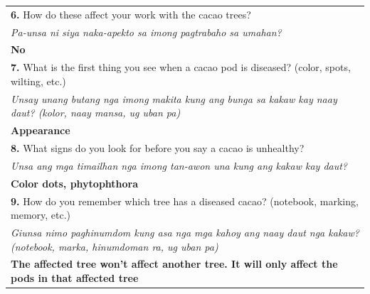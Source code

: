 \begin{longtable}{|p{4cm}|p{10cm}|}
		\multicolumn{2}{|p{12cm}|}{\vspace{0.1cm} \textbf{6.} How do these affect your work with the cacao trees?}                                                                             \\
		\multicolumn{2}{|p{12cm}|}{\textit{Pa-unsa ni siya naka-apekto sa imong pagtrabaho sa umahan?}}                                                                                        \\
		\multicolumn{2}{|p{12cm}|}{\textbf{No}}                                                                                                                                                \\

		\multicolumn{2}{|p{12cm}|}{\vspace{0.1cm} \textbf{7.} What is the first thing you see when a cacao pod is diseased? (color, spots, wilting, etc.)}                                     \\
		\multicolumn{2}{|p{12cm}|}{\textit{Unsay unang butang nga imong makita kung ang bunga sa kakaw kay naay daut? (kolor, naay mansa, ug uban pa)}}                                        \\
		\multicolumn{2}{|p{12cm}|}{\textbf{Appearance}}                                                                                                                                        \\

		\multicolumn{2}{|p{12cm}|}{\vspace{0.1cm} \textbf{8.} What signs do you look for before you say a cacao is unhealthy?}                                                                 \\
		\multicolumn{2}{|p{12cm}|}{\textit{Unsa ang mga timailhan nga imong tan-awon una kung ang kakaw kay daut?}}                                                                            \\
		\multicolumn{2}{|p{12cm}|}{\textbf{Color dots, phytophthora}}                                                                                                                          \\

		\multicolumn{2}{|p{12cm}|}{\vspace{0.1cm} \textbf{9.} How do you remember which tree has a diseased cacao? (notebook, marking, memory, etc.)}                                          \\
		\multicolumn{2}{|p{12cm}|}{\textit{Giunsa nimo paghinumdom kung asa nga mga kahoy ang naay daut nga kakaw? (notebook, marka, hinumdoman ra, ug uban pa)}}                              \\
		\multicolumn{2}{|p{12cm}|}{\textbf{The affected tree won’t affect another tree. It will only affect the pods in that affected tree}}                                                   \\


\end{longtable}
